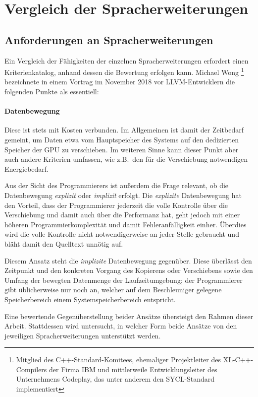 \section{Vergleich der Spracherweiterungen}
\label{vergleich}

\subsection{Anforderungen an Spracherweiterungen}

Ein Vergleich der Fähigkeiten der einzelnen Spracherweiterungen erfordert einen
Kriterienkatalog, anhand dessen die Bewertung erfolgen kann. Michael
Wong \footnote{Mitglied des C++-Standard-Komitees, ehemaliger Projektleiter des
XL-C++-Compilers der Firma IBM und mittlerweile Entwicklungsleiter des
Unternehmens Codeplay, das unter anderem den SYCL-Standard implementiert}
bezeichnete in einem Vortrag im November 2018 vor LLVM-Entwicklern die folgenden
Punkte als essentiell:

\paragraph{Datenbewegung} 
Diese ist stets mit Kosten verbunden. Im Allgemeinen ist damit der Zeitbedarf
gemeint, um Daten etwa vom Hauptspeicher des Systems auf den dedizierten
Speicher der GPU zu verschieben. Im weiteren Sinne kann dieser Punkt aber auch
andere Kriterien umfassen, wie z.B.\ den für die Verschiebung notwendigen
Energiebedarf.

Aus der Sicht des Programmierers ist außerdem die Frage relevant, ob die
Datenbewegung \textit{explizit} oder \textit{implizit} erfolgt. Die
\textit{explizite} Datenbewegung hat den Vorteil, dass der Programmierer
jederzeit die volle Kontrolle über die Verschiebung und damit auch über die
Performanz hat, geht jedoch mit einer höheren Programmierkomplexität und damit
Fehleranfälligkeit einher. Überdies wird die volle Kontrolle nicht
notwendigerweise an jeder Stelle gebraucht und bläht damit den Quelltext unnötig
auf.

Diesem Ansatz steht die \textit{implizite} Datenbewegung gegenüber. Diese
überlässt den Zeitpunkt und den konkreten Vorgang des Kopierens oder
Verschiebens sowie den Umfang der bewegten Datenmenge der Laufzeitumgebung; der
Programmierer gibt üblicherweise nur noch an, welcher auf dem Beschleuniger
gelegene Speicherbereich einem Systemspeicherbereich entspricht.

Eine bewertende Gegenüberstellung beider Ansätze übersteigt den Rahmen dieser
Arbeit. Stattdessen wird untersucht, in welcher Form beide Ansätze von den
jeweiligen Spracherweiterungen unterstützt werden.

